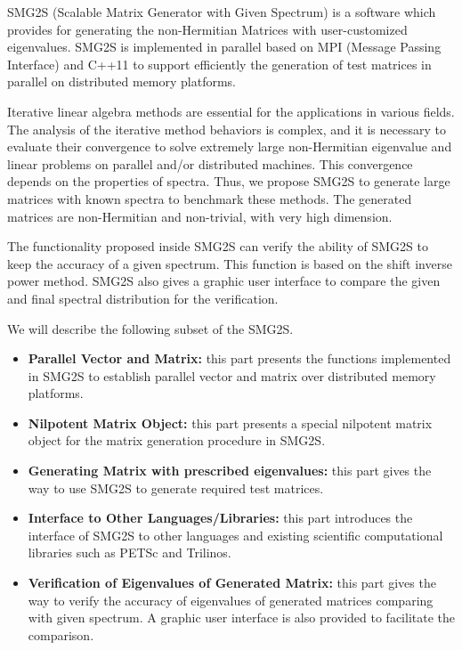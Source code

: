 \documentclass[a4paper, 10 pt]{report}
\begin{document}
    SMG2S (Scalable Matrix Generator with Given Spectrum) \cite{galichergenerate, wu2018parallel} is a software which provides for generating the non-Hermitian Matrices with user-customized eigenvalues. SMG2S is implemented in parallel based on MPI (Message Passing Interface) and C++11 to support efficiently the generation of test matrices in parallel on distributed memory platforms.

Iterative linear algebra methods are essential for the applications in various fields. The analysis of the iterative method behaviors is complex, and it is necessary to evaluate their convergence to solve extremely large non-Hermitian eigenvalue and linear problems on parallel and/or distributed machines. This convergence depends on the properties of spectra. Thus, we propose SMG2S to generate large matrices with known spectra to benchmark these methods. The generated matrices are non-Hermitian and non-trivial, with very high dimension.

The functionality proposed inside SMG2S can verify the ability of SMG2S to keep the accuracy of a given spectrum. This function is based on the shift inverse power method. SMG2S also gives a graphic user interface to compare the given and final spectral distribution for the verification.

We will describe the following subset of the SMG2S.

    \begin{itemize}
	\item \textbf{Parallel Vector and Matrix:} this part presents the functions implemented in SMG2S to establish parallel vector and matrix over distributed memory platforms.
	\item \textbf{Nilpotent Matrix Object:} this part presents a special nilpotent matrix object for the matrix generation procedure in SMG2S.
	\item \textbf{Generating Matrix with prescribed eigenvalues:} this part gives the way to use SMG2S to generate required test matrices.
	\item \textbf{Interface to Other Languages/Libraries:} this part introduces the interface of SMG2S to other languages and existing scientific computational libraries such as PETSc and Trilinos.
	\item \textbf{Verification of Eigenvalues of Generated Matrix:} this part gives the way to verify the accuracy of eigenvalues of generated matrices comparing with given spectrum. A graphic user interface is also provided to facilitate the comparison.
\end{itemize}
\end{document}
